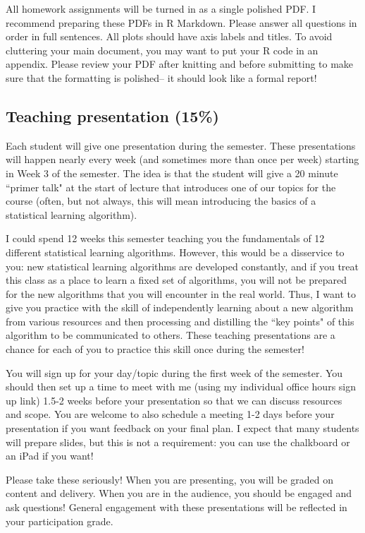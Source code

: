 \documentclass[11pt]{article}
\begin{document}
All homework assignments will be turned in as a single polished PDF. I recommend preparing these PDFs in R Markdown. Please answer all questions in order in full sentences. All plots should have axis labels and titles. To avoid cluttering your main document, you may want to put your R code in an appendix.  Please review your PDF after knitting and before submitting to make sure that the formatting is polished-- it should look like a formal report! 
  
\subsection{Teaching presentation (15\%)}

Each student will give one presentation during the semester. These presentations will happen nearly every week (and sometimes more than once per week) starting in Week 3 of the semester. The idea is that the student will give a 20 minute ``primer talk" at the start of lecture that introduces one of our topics for the course (often, but not always, this will mean introducing the basics of a statistical learning algorithm). 

I could spend 12 weeks this semester teaching you the fundamentals of 12 different statistical learning algorithms. However, this would be a disservice to you: new statistical learning algorithms are developed constantly, and if you treat this class as a place to learn a fixed set of algorithms, you will not be prepared for the new algorithms that you will encounter in the real world. Thus, I want to give you practice with the skill of independently learning about a new algorithm from various resources and then processing and distilling the ``key points" of this algorithm to be communicated to others. These teaching presentations are a chance for each of you to practice this skill once during the semester! 

You will sign up for your day/topic during the first week of the semester. You should then set up a time to meet with me (using my individual office hours sign up link) 1.5-2 weeks before your presentation so that we can discuss resources and scope. You are welcome to also schedule a meeting 1-2 days before your presentation if you want feedback on your final plan. I expect that many students will prepare slides, but this is not a requirement: you can use the chalkboard or an iPad if you want!

Please take these seriously! When you are presenting, you will be graded on content and delivery. When you are in the audience, you should be engaged and ask questions! General engagement with these presentations will be reflected in your participation grade.
\end{document}

